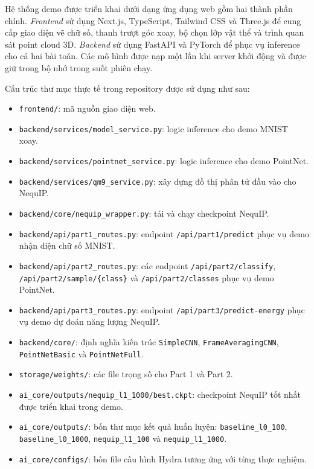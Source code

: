 Hệ thống demo được triển khai dưới dạng ứng dụng web gồm hai thành phần chính. \textit{Frontend} sử dụng Next.js, TypeScript, Tailwind CSS và Three.js để cung cấp giao diện vẽ chữ số, thanh trượt góc xoay, bộ chọn lớp vật thể và trình quan sát point cloud 3D. \textit{Backend} sử dụng FastAPI và PyTorch để phục vụ inference cho cả hai bài toán. Các mô hình được nạp một lần khi server khởi động và được giữ trong bộ nhớ trong suốt phiên chạy.

Cấu trúc thư mục thực tế trong repository được sử dụng như sau:

\begin{itemize} [leftmargin=2cm]
    \item \texttt{frontend/}: mã nguồn giao diện web.
    \item \texttt{backend/services/model\_service.py}: logic inference cho demo MNIST xoay.
    \item \texttt{backend/services/pointnet\_service.py}: logic inference cho demo PointNet.
    \item \texttt{backend/services/qm9\_service.py}: xây dựng đồ thị phân tử đầu vào cho NequIP.
    \item \texttt{backend/core/nequip\_wrapper.py}: tải và chạy checkpoint NequIP.
    \item \texttt{backend/api/part1\_routes.py}: endpoint \texttt{/api/part1/predict} phục vụ demo nhận diện chữ số MNIST.
    \item \texttt{backend/api/part2\_routes.py}: các endpoint \texttt{/api/part2/classify}, \texttt{/api/part2/sample/\{class\}} và \texttt{/api/part2/classes} phục vụ demo PointNet.
    \item \texttt{backend/api/part3\_routes.py}: endpoint \texttt{/api/part3/predict-energy} phục vụ demo dự đoán năng lượng NequIP.
    \item \texttt{backend/core/}: định nghĩa kiến trúc \texttt{SimpleCNN}, \texttt{FrameAveragingCNN}, \texttt{PointNetBasic} và \texttt{PointNetFull}.
    \item \texttt{storage/weights/}: các file trọng số cho Part 1 và Part 2.
    \item \texttt{ai\_core/outputs/nequip\_l1\_1000/best.ckpt}: checkpoint NequIP tốt nhất được triển khai trong demo.
    \item \texttt{ai\_core/outputs/}: bốn thư mục kết quả huấn luyện: \texttt{baseline\_l0\_100}, \texttt{baseline\_l0\_1000}, \texttt{nequip\_l1\_100} và \texttt{nequip\_l1\_1000}.
    \item \texttt{ai\_core/configs/}: bốn file cấu hình Hydra tương ứng với từng thực nghiệm.

\end{itemize}

